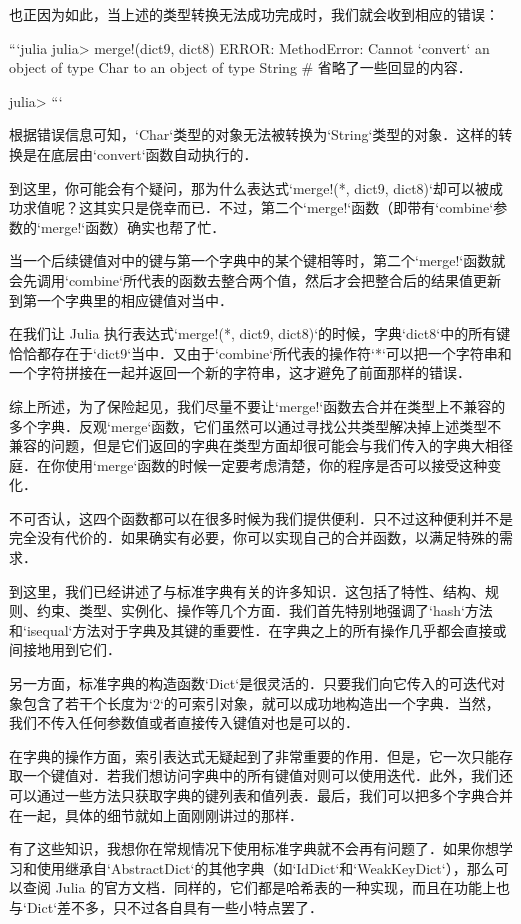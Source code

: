 也正因为如此，当上述的类型转换无法成功完成时，我们就会收到相应的错误：

```julia
julia> merge!(dict9, dict8)
ERROR: MethodError: Cannot `convert` an object of type Char to an object of type String
# 省略了一些回显的内容．

julia> 
```

根据错误信息可知，`Char`类型的对象无法被转换为`String`类型的对象．这样的转换是在底层由`convert`函数自动执行的．

到这里，你可能会有个疑问，那为什么表达式`merge!(*, dict9, dict8)`却可以被成功求值呢？这其实只是侥幸而已．不过，第二个`merge!`函数（即带有`combine`参数的`merge!`函数）确实也帮了忙．

当一个后续键值对中的键与第一个字典中的某个键相等时，第二个`merge!`函数就会先调用`combine`所代表的函数去整合两个值，然后才会把整合后的结果值更新到第一个字典里的相应键值对当中．

在我们让 Julia 执行表达式`merge!(*, dict9, dict8)`的时候，字典`dict8`中的所有键恰恰都存在于`dict9`当中．又由于`combine`所代表的操作符`*`可以把一个字符串和一个字符拼接在一起并返回一个新的字符串，这才避免了前面那样的错误．

综上所述，为了保险起见，我们尽量不要让`merge!`函数去合并在类型上不兼容的多个字典．反观`merge`函数，它们虽然可以通过寻找公共类型解决掉上述类型不兼容的问题，但是它们返回的字典在类型方面却很可能会与我们传入的字典大相径庭．在你使用`merge`函数的时候一定要考虑清楚，你的程序是否可以接受这种变化．

不可否认，这四个函数都可以在很多时候为我们提供便利．只不过这种便利并不是完全没有代价的．如果确实有必要，你可以实现自己的合并函数，以满足特殊的需求．

到这里，我们已经讲述了与标准字典有关的许多知识．这包括了特性、结构、规则、约束、类型、实例化、操作等几个方面．我们首先特别地强调了`hash`方法和`isequal`方法对于字典及其键的重要性．在字典之上的所有操作几乎都会直接或间接地用到它们．

另一方面，标准字典的构造函数`Dict`是很灵活的．只要我们向它传入的可迭代对象包含了若干个长度为`2`的可索引对象，就可以成功地构造出一个字典．当然，我们不传入任何参数值或者直接传入键值对也是可以的．

在字典的操作方面，索引表达式无疑起到了非常重要的作用．但是，它一次只能存取一个键值对．若我们想访问字典中的所有键值对则可以使用迭代．此外，我们还可以通过一些方法只获取字典的键列表和值列表．最后，我们可以把多个字典合并在一起，具体的细节就如上面刚刚讲过的那样．

有了这些知识，我想你在常规情况下使用标准字典就不会再有问题了．如果你想学习和使用继承自`AbstractDict`的其他字典（如`IdDict`和`WeakKeyDict`），那么可以查阅 Julia 的官方文档．同样的，它们都是哈希表的一种实现，而且在功能上也与`Dict`差不多，只不过各自具有一些小特点罢了．